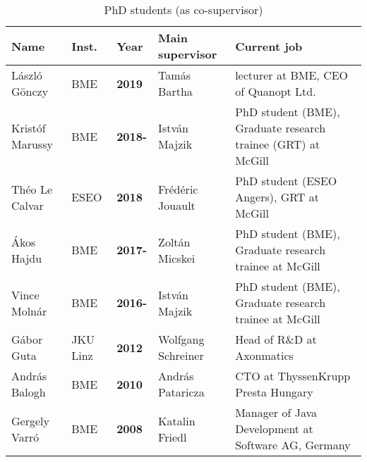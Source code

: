 \begin{table}[htb]
\footnotesize
\begin{tabular}{@{}llllp{8cm}@{}}
\toprule
\textbf{Name} & \textbf{Inst.} & \textbf{Year} & \textbf{Main supervisor} & \textbf{Current job} \\ \midrule
L\'aszl\'o G\"onczy & BME & \textbf{2019}  & Tam\'as Bartha & lecturer at BME, CEO of Quanopt Ltd.\\
Krist\'of Marussy & BME & \textbf{2018-}  & Istv\'an Majzik & PhD student (BME), Graduate research trainee (GRT) at McGill \\
Th\'eo Le Calvar & ESEO & \textbf{2018}  & Fr\'ed\'eric Jouault & PhD student (ESEO Angers), GRT at McGill \\
\'Akos Hajdu & BME & \textbf{2017-}  & Zolt\'an Micskei & PhD student (BME), Graduate research trainee at McGill \\
Vince Moln\'ar & BME & \textbf{2016-}  & Istv\'an Majzik & PhD student (BME), Graduate research trainee at McGill \\
G\'abor Guta & JKU Linz & \textbf{2012}  & Wolfgang Schreiner & Head of R\&D at Axonmatics \\
Andr\'as Balogh & BME & \textbf{2010}  & Andr\'as Pataricza & CTO at ThyssenKrupp Presta Hungary \\
Gergely Varr\'o & BME & \textbf{2008}  & Katalin Friedl & Manager of Java Development at Software AG, Germany \\ \bottomrule
\end{tabular}
\caption{PhD students (as co-supervisor)}
\label{tab:phd-cosupervised}
\end{table}

